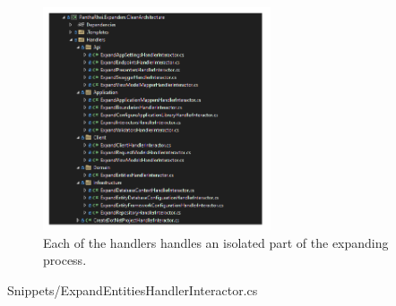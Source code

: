 \begin{figure}[H]
    \centering
    \includegraphics[width=0.6\textwidth]{Figures/expander_handlers.pdf}
    \caption[handlers]{Each of the handlers handles an isolated part of the expanding process.}
    \label{fig:handlers}
\end{figure}


    {Snippets/ExpandEntitiesHandlerInteractor.cs}